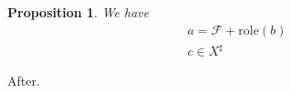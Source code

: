 \documentclass{article}
\newtheorem{proposition}{Proposition}
\newcommand{\DUAL}{{X}^{\sharp}}
\newcommand{\FCN}{\mathcal{F}}
\newcommand{\ROLE}[1]{\mathrm{role}(#1)}
\begin{document}
\begin{proposition}
We have
\begin{multline}
  a = \FCN + \ROLE{b} \\
  c \in \DUAL
\end{multline}
\end{proposition}
After.
\end{document}
